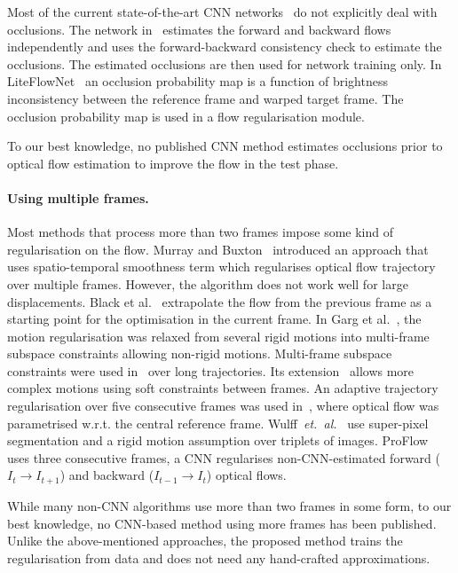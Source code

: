 \documentclass[runningheads]{llncs}
\newcommand{\etal}[0]{~{\it et.~al.}}
\begin{document}
Most of the current state-of-the-art CNN networks~\cite{Dosovitskiy2015,Ilg2016,Ranjan2016,Sun2017} do not explicitly deal with occlusions. 
The network in~\cite{Meister2017} estimates the forward and backward flows independently and uses the forward-backward consistency check to estimate the occlusions. The estimated occlusions are then used for network training only.
In LiteFlowNet~\cite{Hui2018} an occlusion probability map is a function of brightness inconsistency between the reference frame and warped target frame.
The occlusion probability map is used in a flow regularisation module.

To our best knowledge, no published CNN method estimates occlusions prior to optical flow estimation to improve the flow in the test phase.

\paragraph{\bf Using multiple frames.}
Most methods that process more than two frames impose some kind of regularisation on the flow. Murray and Buxton~\cite{Murray1987} introduced an approach that uses spatio-temporal smoothness term which regularises optical flow trajectory over multiple frames. However, the algorithm does not work well for large displacements. 
Black et al.~\cite{Black1991} extrapolate the flow from the previous frame as a starting point for the optimisation in the current frame.
In Garg et al.~\cite{Garg2010}, the motion regularisation was relaxed from several rigid motions into multi-frame subspace constraints allowing non-rigid motions.
Multi-frame subspace constraints were used in~\cite{Irani2002} over long trajectories. Its extension~\cite{Garg2013} allows more complex motions using soft constraints between frames.
An adaptive trajectory regularisation over five consecutive frames was used in~\cite{Volz2011}, where optical flow was parametrised w.r.t. the central reference frame.
Wulff\etal~\cite{Wulff2017} use super-pixel segmentation and a rigid motion assumption over triplets of images. ProFlow~\cite{Maurer2018} uses three consecutive frames, a CNN regularises  non-CNN-estimated forward ($I_t\rightarrow I_{t+1}$) and backward ($I_{t-1}\rightarrow I_t$) optical flows.

While many non-CNN algorithms use more than two frames in some form, to our best knowledge, no CNN-based method using more frames has been published.
Unlike the above-mentioned approaches, the proposed method trains the regularisation from data and does not need any hand-crafted approximations. 
\end{document}
